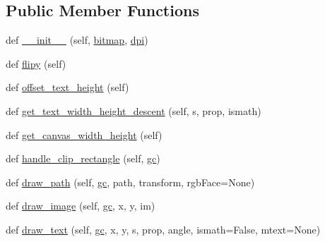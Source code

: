 \subsection*{Public Member Functions}
\begin{DoxyCompactItemize}
\item 
def \hyperlink{classmatplotlib_1_1backends_1_1backend__wx_1_1RendererWx_a2c5b2042fc22d02b25f68faa302b50a7}{\+\_\+\+\_\+init\+\_\+\+\_\+} (self, \hyperlink{classmatplotlib_1_1backends_1_1backend__wx_1_1RendererWx_a2a92b59c7c2e67346511c018368bff71}{bitmap}, \hyperlink{classmatplotlib_1_1backends_1_1backend__wx_1_1RendererWx_a5999c443d2163399de2bc9b9b4ebb433}{dpi})
\item 
def \hyperlink{classmatplotlib_1_1backends_1_1backend__wx_1_1RendererWx_af38a4421e17aaf8ad4d33cdbe3c1746c}{flipy} (self)
\item 
def \hyperlink{classmatplotlib_1_1backends_1_1backend__wx_1_1RendererWx_a6a79f977f9f491cfe6c4b20848f5c40e}{offset\+\_\+text\+\_\+height} (self)
\item 
def \hyperlink{classmatplotlib_1_1backends_1_1backend__wx_1_1RendererWx_a59f9083c98673cdf10c485d59bc5eed8}{get\+\_\+text\+\_\+width\+\_\+height\+\_\+descent} (self, s, prop, ismath)
\item 
def \hyperlink{classmatplotlib_1_1backends_1_1backend__wx_1_1RendererWx_a9765f792b8cfc8248a7e9506809c49a7}{get\+\_\+canvas\+\_\+width\+\_\+height} (self)
\item 
def \hyperlink{classmatplotlib_1_1backends_1_1backend__wx_1_1RendererWx_a62d99bdb9bc9f480db69a0d32f756435}{handle\+\_\+clip\+\_\+rectangle} (self, \hyperlink{classmatplotlib_1_1backends_1_1backend__wx_1_1RendererWx_a130cbf80d305ddfe0710684785c2cea8}{gc})
\item 
def \hyperlink{classmatplotlib_1_1backends_1_1backend__wx_1_1RendererWx_aae5cef65e75a1bb0cab8714eee8d216c}{draw\+\_\+path} (self, \hyperlink{classmatplotlib_1_1backends_1_1backend__wx_1_1RendererWx_a130cbf80d305ddfe0710684785c2cea8}{gc}, path, transform, rgb\+Face=None)
\item 
def \hyperlink{classmatplotlib_1_1backends_1_1backend__wx_1_1RendererWx_a855ce33fbf5e3218defed9fba1131413}{draw\+\_\+image} (self, \hyperlink{classmatplotlib_1_1backends_1_1backend__wx_1_1RendererWx_a130cbf80d305ddfe0710684785c2cea8}{gc}, x, y, im)
\item 
def \hyperlink{classmatplotlib_1_1backends_1_1backend__wx_1_1RendererWx_a515f69d94ed1cb66b7c1fdaca446e9fd}{draw\+\_\+text} (self, \hyperlink{classmatplotlib_1_1backends_1_1backend__wx_1_1RendererWx_a130cbf80d305ddfe0710684785c2cea8}{gc}, x, y, s, prop, angle, ismath=False, mtext=None)

\end{DoxyCompactItemize}
